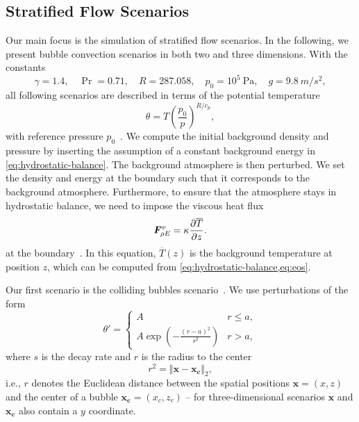 \documentclass[runningheads]{llncs}
\newcommand{\QE}{\rho E}
\newcommand{\potT}{\theta}
\newcommand{\pertubationPotT}{\theta'}
\newcommand{\flux}{\bm{F}}
\newcommand{\viscFlux}{\flux^{v}}
\begin{document}
\subsection{Stratified Flow Scenarios}
Our main focus is the simulation of stratified flow scenarios.
In the following, we present bubble convection scenarios in both two and three dimensions.
With the constants
\begin{equation}\label{eq:atmosphere-constants}
    \gamma = 1.4 ,\quad \Pr =  0.71 ,\quad R = 287.058 ,\quad p_0 = 10^5 \SI{}{\Pa}, \quad g = \SI{9.8}{m/s^2},
\end{equation}
all following scenarios are described in terms of the potential temperature
\begin{equation}
  \potT = T \left( \frac{p_0}{p} \right)^{R/c_p},
\end{equation}
with reference pressure $p_0$~\cite{muller2010adaptive,giraldo2008study}.
%
We compute the initial background density and pressure by inserting the assumption of a constant background energy in \cref{eq:hydrostatic-balance}.
The background atmosphere is then perturbed.
We set the density and energy at the boundary such that it corresponds to the background atmosphere.
Furthermore, to ensure that the atmosphere stays in hydrostatic balance, we need to impose the viscous heat flux
\begin{equation}
  \label{eq:atmosphere-bc}
  \viscFlux_{\QE} = \kappa \pdv{\overline{T}}{z}.%
\end{equation}
at the boundary~\cite{giraldo2008study}.
In this equation, $\overline{T}(z)$ is the background temperature at position $z$, which can be computed from \cref{eq:hydrostatic-balance,eq:eos}.

Our first scenario is the colliding bubbles scenario~\cite{muller2010adaptive}.
We use perturbations of the form
\begin{equation}
  \label{eq:bubbles-pertubation}
  \pertubationPotT =
  \begin{cases}
    A & r \leq a, \\
    A \exp \left( - \frac{(r-a)^2}{s^2} \right) & r > a,
    \end{cases}
\end{equation}
where $s$ is the decay rate and $r$  is the radius to the center
\begin{equation}
  \label{eq:radius}
  r^2 = \Vert \bm{x} - \bm{x_c} \Vert_2,
\end{equation}
i.e., $r$ denotes the Euclidean distance between the spatial positions $\bm{x} = (x, z)$ and the center of a bubble $\bm{x_c} = (x_c, z_c)$ -- for three-dimensional scenarios $\bm{x}$ and $\bm{x_c}$ also contain a $y$ coordinate.
\end{document}
